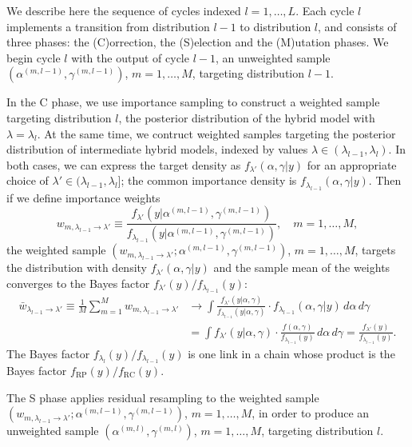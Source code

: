 \documentclass[11pt,letter]{article}
\begin{document}
We describe here the sequence of cycles indexed $l=1,\ldots,L$.
Each cycle $l$ implements a transition from distribution $l-1$ to distribution $l$, and consists of three phases: the (C)orrection, the (S)election and the (M)utation phases.
We begin cycle $l$ with the output of cycle $l-1$, an unweighted sample $(\alpha^{(m,l-1)}, \gamma^{(m,l-1)})$, $m=1,\ldots,M$, targeting distribution $l-1$.

In the C phase, we use importance sampling to construct a weighted sample targeting distribution $l$, the posterior distribution of the hybrid model with $\lambda = \lambda_l$.
At the same time, we contruct weighted samples targeting the posterior distribution of intermediate hybrid models, indexed by values $\lambda \in (\lambda_{l-1}, \lambda_l)$.
In both cases, we can express the target density as $f_{\lambda'}(\alpha,\gamma|y)$ for an appropriate choice of $\lambda' \in (\lambda_{l-1}, \lambda_l]$; the common importance density is $f_{\lambda_{l-1}}(\alpha,\gamma|y)$.
Then if we define importance weights
\begin{equation}\label{e:weights}
  w_{m,\lambda_{l-1} \to \lambda'} \equiv \frac{f_{\lambda'}(y|\alpha^{(m,l-1)},\gamma^{(m,l-1)})}{f_{\lambda_{l-1}}(y|\alpha^{(m,l-1)},\gamma^{(m,l-1)})},\quad m=1,\ldots,M,
\end{equation}
the weighted sample $(w_{m,\lambda_{l-1} \to \lambda'};\alpha^{(m,l-1)}, \gamma^{(m,l-1)})$, $m=1,\ldots,M$, targets the distribution with density $f_{\lambda'}(\alpha, \gamma|y)$ and the sample mean of the weights converges to the Bayes factor $f_{\lambda'}(y)/f_{\lambda_{l-1}}(y)$:
\begin{equation}\label{e:marl}
  \begin{aligned}
    \bar{w}_{\lambda_{l-1} \to \lambda'} \equiv \frac{1}{M} \sum_{m=1}^M w_{m,\lambda_{l-1} \to \lambda'}
    &\rightarrow
    \int \frac{f_{\lambda'}(y|\alpha,\gamma)}{f_{\lambda_{l-1}}(y|\alpha,\gamma)}
    \cdot f_{\lambda_{l-1}}(\alpha,\gamma|y) \, d\alpha\, d\gamma \\
    &=
    \int f_{\lambda'}(y|\alpha, \gamma) \cdot \frac{f(\alpha, \gamma)}{f_{\lambda_{l-1}}(y)} \, d\alpha\, d\gamma
        = \frac{f_{\lambda'}(y)}{f_{\lambda_{l-1}}(y)}.
  \end{aligned}
\end{equation}
The Bayes factor $f_{\lambda_l}(y)/f_{\lambda_{l-1}}(y)$ is one link in a chain whose product is the Bayes factor $f_\mathrm{RP}(y)/f_\mathrm{RC}(y)$.

The S phase applies residual resampling to the weighted sample $(w_{m,\lambda_{l-1} \to \lambda'};\alpha^{(m,l-1)}, \gamma^{(m,l-1)})$, $m=1,\ldots,M$, in order to produce an unweighted sample $(\alpha^{(m,l)}, \gamma^{(m,l)})$, $m=1,\ldots,M$, targeting distribution $l$.
\end{document}

